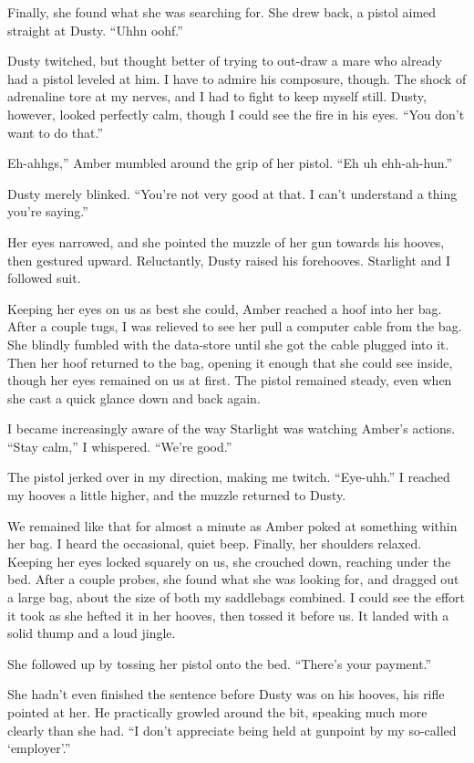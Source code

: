 Finally, she found what she was searching for. She drew back, a pistol aimed straight at Dusty. “Uhhn oohf.”

Dusty twitched, but thought better of trying to out-draw a mare who already had a pistol leveled at him. I have to admire his composure, though. The shock of adrenaline tore at my nerves, and I had to fight to keep myself still. Dusty, however, looked perfectly calm, though I could see the fire in his eyes. “You don’t want to do that.”

\leavevmode{}Eh-ahhgs,” Amber mumbled around the grip of her pistol. “Eh uh ehh-ah-hun.”

Dusty merely blinked. “You’re not very good at that. I can’t understand a thing you’re saying.”

Her eyes narrowed, and she pointed the muzzle of her gun towards his hooves, then gestured upward. Reluctantly, Dusty raised his forehooves. Starlight and I followed suit.

Keeping her eyes on us as best she could, Amber reached a hoof into her bag. After a couple tugs, I was relieved to see her pull a computer cable from the bag. She blindly fumbled with the data-store until she got the cable plugged into it. Then her hoof returned to the bag, opening it enough that she could see inside, though her eyes remained on us at first. The pistol remained steady, even when she cast a quick glance down and back again.

I became increasingly aware of the way Starlight was watching Amber’s actions. “Stay calm,” I whispered. “We’re good.”

The pistol jerked over in my direction, making me twitch. “Eye-uhh.” I reached my hooves a little higher, and the muzzle returned to Dusty.

We remained like that for almost a minute as Amber poked at something within her bag. I heard the occasional, quiet beep. Finally, her shoulders relaxed. Keeping her eyes locked squarely on us, she crouched down, reaching under the bed. After a couple probes, she found what she was looking for, and dragged out a large bag, about the size of both my saddlebags combined. I could see the effort it took as she hefted it in her hooves, then tossed it before us. It landed with a solid thump and a loud jingle.

She followed up by tossing her pistol onto the bed. “There’s your payment.”

She hadn’t even finished the sentence before Dusty was on his hooves, his rifle pointed at her. He practically growled around the bit, speaking much more clearly than she had. “I don’t appreciate being held at gunpoint by my so-called ‘employer’.”

